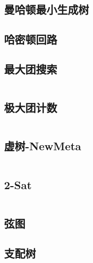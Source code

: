 \subsection{曼哈顿最小生成树}

\subsection{哈密顿回路}

\subsection{最大团搜索}
\inputminted[breaklines]{cpp}{./graph-theory/maximum-clique.cpp}
\subsection{极大团计数}
\inputminted[breaklines]{cpp}{./graph-theory/maximum-clique-counting.cpp}
\subsection{虚树-NewMeta}
\inputminted[breaklines]{cpp}{./graph-theory/virtual-tree-NewMeta.cpp}
\subsection{2-Sat}
\inputminted[breaklines]{cpp}{./graph-theory/2-sat.cpp}
\subsection{弦图}

\subsection{支配树}
\inputminted[breaklines]{cpp}{./graph-theory/dominator-tree.cpp}